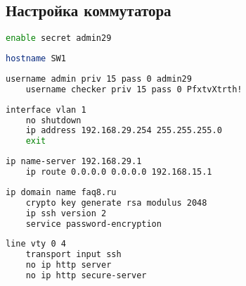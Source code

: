 \subsection{Настройка коммутатора}

\begin{lstlisting}[language=bash, caption=Изменение пароля админа]
    enable secret admin29   
\end{lstlisting}

\begin{lstlisting}[language=bash, caption=Настройка имени]
    hostname SW1
\end{lstlisting}

\begin{lstlisting}[language=bash, caption=Создание пользователей]
    username admin priv 15 pass 0 admin29
    username checker priv 15 pass 0 PfxtvXtrth!    
\end{lstlisting}

\begin{lstlisting}[language=bash, caption=Настройка $ip$]
    interface vlan 1 
    no shutdown 
    ip address 192.168.29.254 255.255.255.0
    exit      
\end{lstlisting}

\begin{lstlisting}[language=bash, caption=Настройка $DNS$]
    ip name-server 192.168.29.1
    ip route 0.0.0.0 0.0.0.0 192.168.15.1        
\end{lstlisting}

\begin{lstlisting}[language=bash, caption=Настройка $SSH$]
    ip domain name faq8.ru
    crypto key generate rsa modulus 2048
    ip ssh version 2
    service password-encryption
\end{lstlisting}

\begin{lstlisting}[language=bash, caption=Отключение ненужных подключений]
    line vty 0 4
    transport input ssh
    no ip http server
    no ip http secure-server    
\end{lstlisting}